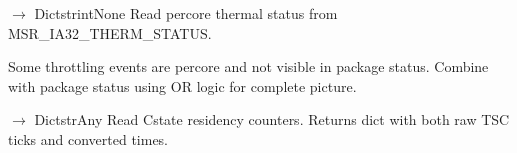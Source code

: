 \documentclass[letterpaper,10pt,english]{sphinxmanual}
\begin{document}
\begin{fulllineitems}
\begin{fulllineitems}
\end{fulllineitems}


\begin{fulllineitems}
\label{\detokenize{core.readers.msr_reader:core.readers.msr_reader.MSRReader.read_core_thermal_status}}
\pysigstartsignatures
\pysiglinewithargsret
{}
{\sphinxparamcomma {}}
{{ $\rightarrow$ Dict\DUrole{p}{{[}}strint\DUrole{p}{{]}}None}}
\pysigstopsignatures
\sphinxAtStartPar
Read per\sphinxhyphen{}core thermal status from MSR\_IA32\_THERM\_STATUS.

\sphinxAtStartPar
Some throttling events are per\sphinxhyphen{}core and not visible in package status.
Combine with package status using OR logic for complete picture.

\end{fulllineitems}


\begin{fulllineitems}
\label{\detokenize{core.readers.msr_reader:core.readers.msr_reader.MSRReader.read_cstate_counters}}
\pysigstartsignatures
\pysiglinewithargsret
{}
{\sphinxparamcomma {}}
{{ $\rightarrow$ Dict\DUrole{p}{{[}}strAny\DUrole{p}{{]}}}}
\pysigstopsignatures
\sphinxAtStartPar
Read C\sphinxhyphen{}state residency counters.
Returns dict with both raw TSC ticks and converted times.

\end{fulllineitems}


\end{fulllineitems}
\end{document}
